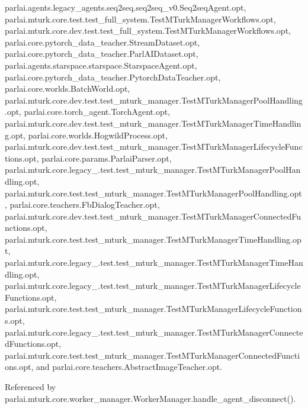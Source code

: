 parlai.\+agents.\+legacy\+\_\+agents.\+seq2seq.\+seq2seq\+\_\+v0.\+Seq2seq\+Agent.\+opt, parlai.\+mturk.\+core.\+test.\+test\+\_\+full\+\_\+system.\+Test\+M\+Turk\+Manager\+Workflows.\+opt, parlai.\+mturk.\+core.\+dev.\+test.\+test\+\_\+full\+\_\+system.\+Test\+M\+Turk\+Manager\+Workflows.\+opt, parlai.\+core.\+pytorch\+\_\+data\+\_\+teacher.\+Stream\+Dataset.\+opt, parlai.\+core.\+pytorch\+\_\+data\+\_\+teacher.\+Parl\+A\+I\+Dataset.\+opt, parlai.\+agents.\+starspace.\+starspace.\+Starspace\+Agent.\+opt, parlai.\+core.\+pytorch\+\_\+data\+\_\+teacher.\+Pytorch\+Data\+Teacher.\+opt, parlai.\+core.\+worlds.\+Batch\+World.\+opt, parlai.\+mturk.\+core.\+dev.\+test.\+test\+\_\+mturk\+\_\+manager.\+Test\+M\+Turk\+Manager\+Pool\+Handling.\+opt, parlai.\+core.\+torch\+\_\+agent.\+Torch\+Agent.\+opt, parlai.\+mturk.\+core.\+dev.\+test.\+test\+\_\+mturk\+\_\+manager.\+Test\+M\+Turk\+Manager\+Time\+Handling.\+opt, parlai.\+core.\+worlds.\+Hogwild\+Process.\+opt, parlai.\+mturk.\+core.\+dev.\+test.\+test\+\_\+mturk\+\_\+manager.\+Test\+M\+Turk\+Manager\+Lifecycle\+Functions.\+opt, parlai.\+core.\+params.\+Parlai\+Parser.\+opt, parlai.\+mturk.\+core.\+legacy\+\_.\+test.\+test\+\_\+mturk\+\_\+manager.\+Test\+M\+Turk\+Manager\+Pool\+Handling.\+opt, parlai.\+mturk.\+core.\+test.\+test\+\_\+mturk\+\_\+manager.\+Test\+M\+Turk\+Manager\+Pool\+Handling.\+opt, parlai.\+core.\+teachers.\+Fb\+Dialog\+Teacher.\+opt, parlai.\+mturk.\+core.\+dev.\+test.\+test\+\_\+mturk\+\_\+manager.\+Test\+M\+Turk\+Manager\+Connected\+Functions.\+opt, parlai.\+mturk.\+core.\+test.\+test\+\_\+mturk\+\_\+manager.\+Test\+M\+Turk\+Manager\+Time\+Handling.\+opt, parlai.\+mturk.\+core.\+legacy\+\_.\+test.\+test\+\_\+mturk\+\_\+manager.\+Test\+M\+Turk\+Manager\+Time\+Handling.\+opt, parlai.\+mturk.\+core.\+legacy\+\_.\+test.\+test\+\_\+mturk\+\_\+manager.\+Test\+M\+Turk\+Manager\+Lifecycle\+Functions.\+opt, parlai.\+mturk.\+core.\+test.\+test\+\_\+mturk\+\_\+manager.\+Test\+M\+Turk\+Manager\+Lifecycle\+Functions.\+opt, parlai.\+mturk.\+core.\+legacy\+\_.\+test.\+test\+\_\+mturk\+\_\+manager.\+Test\+M\+Turk\+Manager\+Connected\+Functions.\+opt, parlai.\+mturk.\+core.\+test.\+test\+\_\+mturk\+\_\+manager.\+Test\+M\+Turk\+Manager\+Connected\+Functions.\+opt, and parlai.\+core.\+teachers.\+Abstract\+Image\+Teacher.\+opt.



Referenced by parlai.\+mturk.\+core.\+worker\+\_\+manager.\+Worker\+Manager.\+handle\+\_\+agent\+\_\+disconnect().

